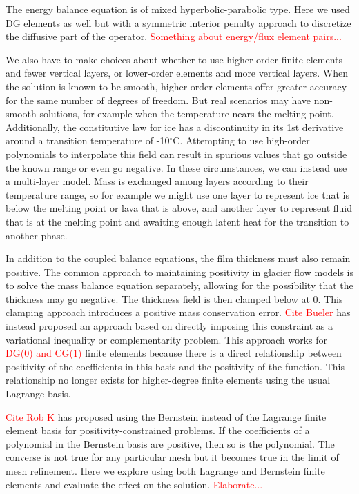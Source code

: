 \documentclass{article}
\theoremstyle{definition}
\theoremstyle{plain}
\begin{document}
The energy balance equation is of mixed hyperbolic-parabolic type.
Here we used DG elements as well but with a symmetric interior penalty approach to discretize the diffusive part of the operator.
\textcolor{red}{Something about energy/flux element pairs...}

We also have to make choices about whether to use higher-order finite elements and fewer vertical layers, or lower-order elements and more vertical layers.
When the solution is known to be smooth, higher-order elements offer greater accuracy for the same number of degrees of freedom.
But real scenarios may have non-smooth solutions, for example when the temperature nears the melting point.
Additionally, the constitutive law for ice has a discontinuity in its 1st derivative around a transition temperature of -10${}^\circ$C.
Attempting to use high-order polynomials to interpolate this field can result in spurious values that go outside the known range or even go negative.
In these circumstances, we can instead use a multi-layer model.
Mass is exchanged among layers according to their temperature range, so for example we might use one layer to represent ice that is below the melting point or lava that is above, and another layer to represent fluid that is at the melting point and awaiting enough latent heat for the transition to another phase.

In addition to the coupled balance equations, the film thickness must also remain positive.
The common approach to maintaining positivity in glacier flow models is to solve the mass balance equation separately, allowing for the possibility that the thickness may go negative.
The thickness field is then clamped below at 0.
This clamping approach introduces a positive mass conservation error.
\textcolor{red}{Cite Bueler} has instead proposed an approach based on directly imposing this constraint as a variational inequality or complementarity problem.
This approach works for \textcolor{red}{DG(0) and CG(1)} finite elements because there is a direct relationship between positivity of the coefficients in this basis and the positivity of the function.
This relationship no longer exists for higher-degree finite elements using the usual Lagrange basis.

\textcolor{red}{Cite Rob K} has proposed using the Bernstein instead of the Lagrange finite element basis for positivity-constrained problems.
If the coefficients of a polynomial in the Bernstein basis are positive, then so is the polynomial.
The converse is not true for any particular mesh but it becomes true in the limit of mesh refinement.
Here we explore using both Lagrange and Bernstein finite elements and evaluate the effect on the solution.
\textcolor{red}{Elaborate...}
\end{document}
